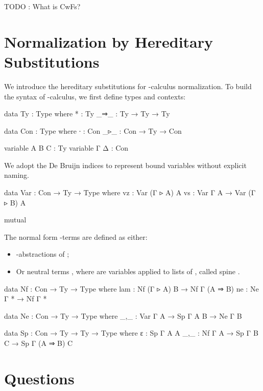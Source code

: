 TODO : What is CwFs?

\section{Normalization by Hereditary Substitutions}

We introduce the hereditary substitutions for \lambda-calculus normalization. To build the syntax of \lambda-calculus, we first define types and contexts:

\begin{code}
data Ty : Type where
  *   : Ty
  _⇒_ : Ty → Ty → Ty

data Con : Type where
  ∙   : Con
  _▹_ : Con → Ty → Con
\end{code}

\begin{code}[hide]
variable A B C : Ty
variable Γ Δ : Con
\end{code}

We adopt the De Bruijn indices to represent bound variables without explicit naming.

\begin{code}
data Var : Con → Ty → Type where
  vz : Var (Γ ▹ A) A
  vs : Var Γ A → Var (Γ ▹ B) A
\end{code}

\begin{code}[hide]
mutual
\end{code}

The normal form \lambda-terms  are defined as either:

\begin{itemize}
  \item{\lambda-abstractions of ;}
  \item{Or neutral terms , where  are variables  applied to lists of , called spine }.
\end{itemize}

\begin{code}
  data Nf : Con → Ty → Type where
    lam : Nf (Γ ▹ A) B → Nf Γ (A ⇒ B)
    ne  : Ne Γ * → Nf Γ *

  data Ne : Con → Ty → Type where
    _,_ : Var Γ A → Sp Γ A B → Ne Γ B

  data Sp : Con → Ty → Ty → Type where
    ε   : Sp Γ A A
    _,_ : Nf Γ A → Sp Γ B C → Sp Γ (A ⇒ B) C
\end{code}

\section{Questions}


